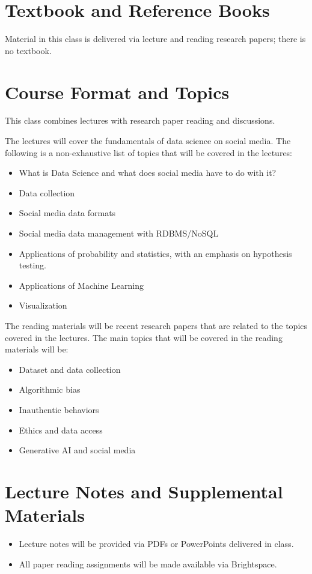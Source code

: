 \documentclass[11pt,article,oneside]{memoir} %
\begin{document}
\section{Textbook and Reference Books}

Material in this class is delivered via lecture and reading research papers; there is no
textbook.

\section{Course Format and Topics}

This class combines lectures with research paper reading and discussions.

The lectures will cover the fundamentals of data science on social media.
The following is a non-exhaustive list of topics that will be covered in the lectures:

\begin{itemize}
    \item What is Data Science and what does social media have to do with it?
    \item Data collection
    \item Social media data formats
    \item Social media data management with RDBMS/NoSQL
    \item Applications of probability and statistics, with an emphasis on hypothesis testing.
    \item Applications of Machine Learning
    \item Visualization
\end{itemize}

The reading materials will be recent research papers that are related to the topics covered in the lectures.
The main topics that will be covered in the reading materials will be:

\begin{itemize}
    \item Dataset and data collection
    \item Algorithmic bias
    \item Inauthentic behaviors
    \item Ethics and data access
    \item Generative AI and social media
\end{itemize}


\section{Lecture Notes and Supplemental Materials}
\begin{itemize}
    \item Lecture notes will be provided via PDFs or PowerPoints delivered in class.
    \item All paper reading assignments will be made available via Brightspace.
\end{itemize}
\end{document}
